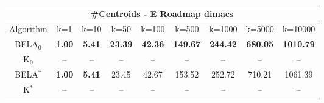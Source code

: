 \begin{tabular}{c|cccccccc}\toprule
\multicolumn{9}{c}{#Centroids - E Roadmap dimacs}\\ \midrule
Algorithm & k=1 & k=10 & k=50 & k=100 & k=500 & k=1000 & k=5000 & k=10000 \\ \midrule
BELA$_0$ & \textbf{1.00} & \textbf{5.41} & \textbf{23.39} & \textbf{42.36} & \textbf{149.67} & \textbf{244.42} & \textbf{680.05} & \textbf{1010.79} \\
K$_0$ & -- & -- & -- & -- & -- & -- & -- & -- \\
BELA$^*$ & \textbf{1.00} & \textbf{5.41} & 23.45 & 42.67 & 153.52 & 252.72 & 710.21 & 1061.39 \\
K$^*$ & -- & -- & -- & -- & -- & -- & -- & -- \\ \bottomrule 
\end{tabular}
